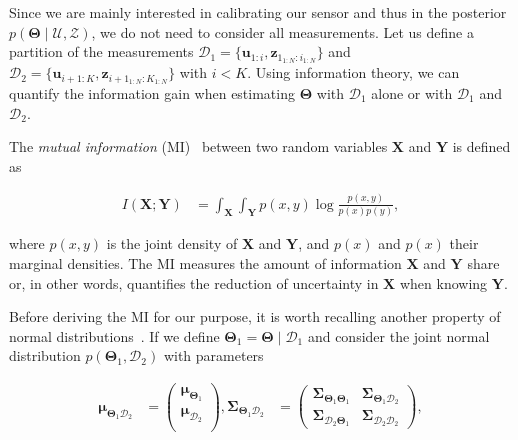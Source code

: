 Since we are mainly interested in calibrating our sensor and thus in the
posterior $p(\boldsymbol{\Theta}\mid\mathcal{U},\mathcal{Z})$, we do not need
to consider all measurements. Let us define a partition of the measurements
$\mathcal{D}_1=\{\mathbf{u}_{1:i}, \mathbf{z}_{1_{1:N}:i_{1:N}}\}$ and
$\mathcal{D}_2=\{\mathbf{u}_{i+1:K}, \mathbf{z}_{i+1_{1:N}:K_{1:N}}\}$ with
$i<K$. Using information theory, we can quantify the information gain when
estimating $\boldsymbol{\Theta}$ with $\mathcal{D}_1$ alone or with
$\mathcal{D}_1$ and $\mathcal{D}_2$.

The \emph{mutual information} (MI)~\cite{mackay05information} between two random
variables $\mathbf{X}$ and $\mathbf{Y}$ is defined as

\begin{equation}\label{eqn:mi_definition}
  \begin{aligned}
  I(\mathbf{X};\mathbf{Y}) &=
    \int_{\mathbf{X}}\int_{\mathbf{Y}}p(x, y)\log\frac{p(x,y)}{p(x)p(y)},
  \end{aligned}
\end{equation}

\noindent where $p(x, y)$ is the joint density of $\mathbf{X}$ and $\mathbf{Y}$,
and $p(x)$ and $p(x)$ their marginal densities. The MI measures the amount of
information $\mathbf{X}$ and $\mathbf{Y}$ share or, in other words, quantifies
the reduction of uncertainty in $\mathbf{X}$ when knowing $\mathbf{Y}$.

Before deriving the MI for our purpose, it is worth recalling another property
of normal distributions~\cite{bishop06pattern}. If we define
$\mathbf{\Theta}_1=\mathbf{\Theta}\mid\mathcal{D}_1$ and consider the joint
normal distribution $p(\mathbf{\Theta}_1,\mathcal{D}_2)$ with parameters

\begin{equation}\label{eqn:joint_normal}
  \begin{aligned}
  \boldsymbol{\mu}_{\boldsymbol{\Theta}_1\mathcal{D}_2} &=
    \begin{pmatrix}
    \boldsymbol{\mu}_{\boldsymbol{\Theta}_1}\\
    \boldsymbol{\mu}_{\mathcal{D}_2}\\
    \end{pmatrix},
  \boldsymbol{\Sigma}_{\boldsymbol{\Theta}_1\mathcal{D}_2} &=
    \begin{pmatrix}
    \boldsymbol{\Sigma}_{\boldsymbol{\Theta}_1\boldsymbol{\Theta}_1}&
    \boldsymbol{\Sigma}_{\boldsymbol{\Theta}_1\mathcal{D}_2}\\
    \boldsymbol{\Sigma}_{\mathcal{D}_2\boldsymbol{\Theta}_1}&
    \boldsymbol{\Sigma}_{\mathcal{D}_2\mathcal{D}_2}
    \end{pmatrix},
  \end{aligned}
\end{equation}


